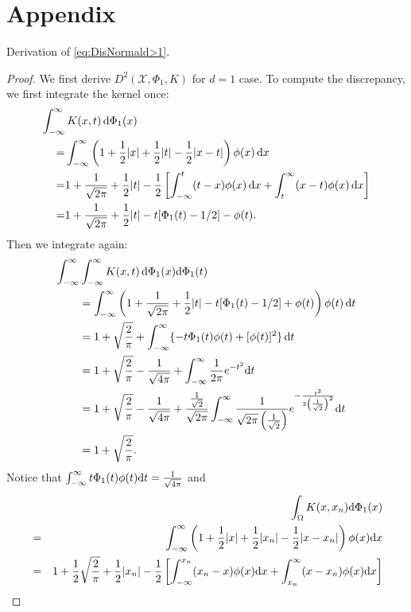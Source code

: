 \documentclass[graybox]{svmult}
\newcommand{\dif}{{\rm d}}
\newcommand{\Xdes}{\mathcal{X}}
\begin{document}
\section*{Appendix}
Derivation of \eqref{eq:DisNormald>1}. 
\begin{proof}
We first derive $D^2(\Xdes,\Phi_1,K)$ for $d=1$ case. 
To compute the discrepancy, we first integrate the kernel once:
\begin{align*}
\MoveEqLeft{\int_{-\infty}^\infty K(x,t) \, \dif \Phi_1(x)}\\
=&\int_{-\infty}^{\infty} \left(1+\frac{1}{2}|x|+\frac{1}{2}|t|-\frac{1}{2}|x-t|\right)\phi(x) \, \dif x\\
=& 1+ \frac{1}{\sqrt{2\pi}} + \frac{1}{2}|t|-\frac{1}{2}\left[\int_{-\infty}^{t}(t-x)\phi(x) \, \dif x+\int_{t}^{\infty} (x-t)\phi(x) \, \dif x\right]\\
=& 1+ \frac{1}{\sqrt{2\pi}} + \frac{1}{2}|t| - t [\Phi_1(t)-1/2] - \phi(t) .
\end{align*}
Then we integrate again:
\begin{align*}
\MoveEqLeft{\int_{-\infty}^\infty \int_{-\infty}^\infty K(x,t) \, \dif \Phi_1(x) \dif \Phi_1(t)}\\
& =  \int_{-\infty}^{\infty} \left( 1+\frac{1}{\sqrt{2\pi}} + \frac{1}{2}|t| - t [\Phi_1(t)-1/2] + \phi(t)\right)\phi(t) \, \dif t\\
&= 1+ \sqrt{\frac{2}{\pi}} + \int_{-\infty}^{\infty} \{ - t \Phi_1(t)\phi(t)  +  [\phi(t)]^2 \} \, \dif t\\
&= 1+\sqrt{\frac{2}{\pi}}-\frac{1}{\sqrt{4\pi}}+\int_{-\infty}^{\infty}\frac{1}{2\pi}e^{-t^2}\dif t\\
&= 1+\sqrt{\frac{2}{\pi}}-\frac{1}{\sqrt{4\pi}}+\frac{\frac{1}{\sqrt{2}}}{\sqrt{2\pi}}\int_{-\infty}^{\infty}\frac{1}{\sqrt{2\pi}\left(\frac{1}{\sqrt{2}}\right)}e^{-\frac{t^2}{2\left(\frac{1}{\sqrt{2}}\right)^2}}\dif t\\
&=1+\sqrt{\frac{2}{\pi}}. 
\end{align*}
Notice that $\int_{-\infty}^{\infty} t\Phi_1(t)\phi(t)\dif t = \frac{1}{\sqrt{4\pi}}$ and 
\begin{eqnarray*}
&&\int_{\Omega}K(x,x_n)\dif \Phi_1(x)\\
&=& \int_{-\infty}^{\infty} \left(1+\frac{1}{2}|x|+\frac{1}{2}|x_n|-\frac{1}{2}|x-x_n|\right)\phi(x)\dif x\\
&=& 1+\frac{1}{2}\sqrt{\frac{2}{\pi}}+\frac{1}{2}|x_n|-\frac{1}{2}\left[\int_{-\infty}^{x_n}(x_n-x)\phi(x)\dif x+\int_{x_n}^{\infty} (x-x_n)\phi(x)\dif x\right]\\

\end{eqnarray*}
\end{proof}
\end{document}
